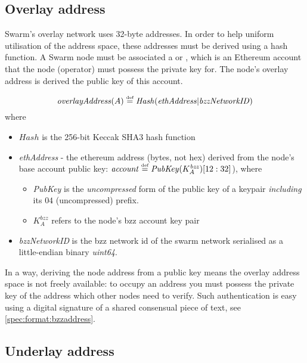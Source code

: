 \subsection{Overlay address \statusyellow}

Swarm's overlay network uses 32-byte addresses. In order to help  uniform utilisation of the address space,  these addresses must be derived using a hash function. A Swarm node must be associated a  or , which is an Ethereum account that the node (operator) must possess the private key for. The node's overlay address is derived the public key of this account. 

\begin{definition}\label{def:overlay}
\begin{equation}
\mathit{overlayAddress}(A) \overset{\textrm{\tiny def}}{=} \mathit{Hash}(\mathit{ethAddress}|\mathit{bzzNetworkID})         
\end{equation}
where
\begin{itemize}
\item $\mathit{Hash}$ is the 256-bit Keccak SHA3 hash function
\item \emph{ethAddress} - the ethereum address  (bytes,  not hex) derived from the node's base account public key: $\mathit{account}\overset{\textrm{\tiny def}}{=}\mathit{PubKey}(K_A^\mathit{bzz})[12:32]$), where
    \begin{itemize}
    \item \emph{PubKey} is the \emph{uncompressed} form of the public key of a keypair \emph{including} its $04$ (uncompressed) prefix.
    \item $K_A^\mathit{bzz}$ refers to the node's bzz account key pair
    \end{itemize}
\item \emph{bzzNetworkID} is the bzz network id of the swarm network serialised as a little-endian binary \emph{uint64}.
\end{itemize}
\end{definition}

In a way, deriving the node address from a public key means the overlay address space is not freely available: to occupy an address you must possess the private key of the address which other nodes need to verify. Such authentication is easy using a digital signature of a shared consensual piece of text, see \ref{spec:format:bzzaddress}.

\subsection{Underlay address \statusyellow}

